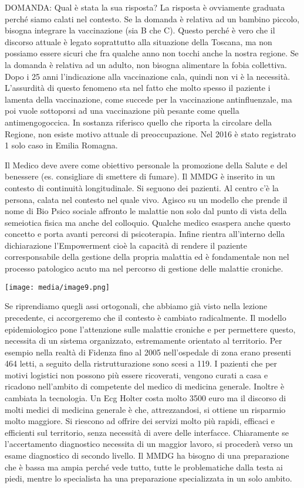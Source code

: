 \documentclass[]{article}
\begin{document}
DOMANDA: Qual è stata la sua risposta? La risposta è ovviamente graduata
perché siamo calati nel contesto. Se la domanda è relativa ad un bambino
piccolo, bisogna integrare la vaccinazione (sia B che C). Questo perché
è vero che il discorso attuale è legato soprattutto alla situazione
della Toscana, ma non possiamo essere sicuri che fra qualche anno non
tocchi anche la nostra regione. Se la domanda è relativa ad un adulto,
non bisogna alimentare la fobia collettiva. Dopo i 25 anni l'indicazione
alla vaccinazione cala, quindi non vi è la necessità. L'assurdità di
questo fenomeno sta nel fatto che molto spesso il paziente i lamenta
della vaccinazione, come succede per la vaccinazione antinfluenzale, ma
poi vuole sottoporsi ad una vaccinazione più pesante come quella
antimengogoccica. In sostanza riferisco quello che riporta la circolare
della Regione, non esiste motivo attuale di preoccupazione. Nel 2016 è
stato registrato 1 solo caso in Emilia Romagna.

Il Medico deve avere come obiettivo personale la promozione della Salute
e del benessere (es. consigliare di smettere di fumare). Il MMDG è
inserito in un contesto di continuità longitudinale. Si seguono dei
pazienti. Al centro c'è la persona, calata nel contesto nel quale vivo.
Agisco su un modello che prende il nome di Bio Psico sociale affronto le
malattie non solo dal punto di vista della semeiotica fisica ma anche
del colloquio. Qualche medico esaspera anche questo concetto e porta
avanti percorsi di psicoterapia. Infine rientra all'interno della
dichiarazione l'Empowerment cioè la capacità di rendere il paziente
corresponsabile della gestione della propria malattia ed è fondamentale
non nel processo patologico acuto ma nel percorso di gestione delle
malattie croniche.

\texttt{[image: media/image9.png]}

Se riprendiamo quegli assi ortogonali, che abbiamo già visto nella
lezione precedente, ci accorgeremo che il contesto è cambiato
radicalmente. Il modello epidemiologico pone l'attenzione sulle malattie
croniche e per permettere questo, necessita di un sistema organizzato,
estremamente orientato al territorio. Per esempio nella realtà di
Fidenza fino al 2005 nell'ospedale di zona erano presenti 464 letti, a
seguito della ristrutturazione sono scesi a 119. I pazienti che per
motivi logistici non possono più essere ricoverati, vengono curati a
casa e ricadono nell'ambito di competente del medico di medicina
generale. Inoltre è cambiata la tecnologia. Un Ecg Holter costa molto
3500 euro ma il discorso di molti medici di medicina generale è che,
attrezzandosi, si ottiene un risparmio molto maggiore. Si riescono ad
offrire dei servizi molto più rapidi, efficaci e efficienti sul
territorio, senza necessità di avere delle interfacce. Chiaramente se
l'accertamento diagnostico necessita di un maggior lavoro, si procederà
verso un esame diagnostico di secondo livello. Il MMDG ha bisogno di una
preparazione che è bassa ma ampia perché vede tutto, tutte le
problematiche dalla testa ai piedi, mentre lo specialista ha una
preparazione specializzata in un solo ambito.
\end{document}
